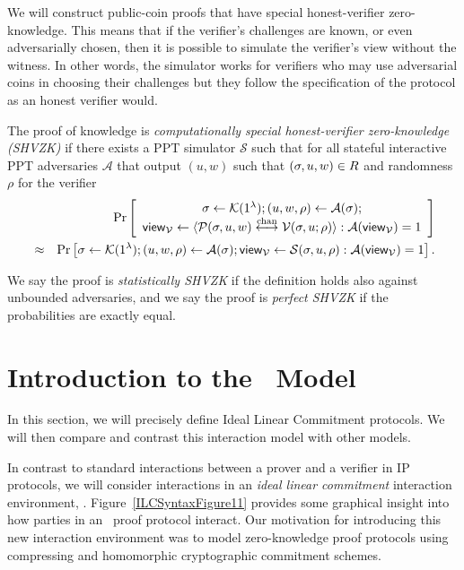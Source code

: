 We will construct public-coin proofs that have special honest-verifier zero-knowledge. This means that if the verifier's challenges are known, or even adversarially chosen, then it is possible to simulate the verifier's view without the witness.  In other words, the simulator works for verifiers who may use adversarial coins in choosing their challenges but they follow the specification of the protocol as an honest verifier would. 
\begin{definition}
The proof of knowledge is \emph{computationally special honest-verifier zero-knowledge (SHVZK)} if there exists a PPT simulator $\mathcal{S}$ such that for all stateful interactive PPT adversaries $\mathcal{A}$ that output $(u,w)$ such that $(\mathsf{\sigma},u,w)\in R$ and randomness $\rho$ for the verifier
\begin{eqnarray*}
&&\Pr \left[ \begin{array}{c}\mathsf{\sigma}\gets \mathcal{K}(1^{\lambda});(u, w, \rho) \leftarrow\mathcal{A}(\mathsf{\sigma}); \\
\mathsf{view}_{\mathcal{V}}\leftarrow \langle \mathcal{P}(\mathsf{\sigma},u,w)\overset{\textnormal{chan}}{\longleftrightarrow} \mathcal{V}(\mathsf{\sigma},u;\rho)\rangle: \mathcal{A}(\mathsf{view}_{\mathcal{V}})=1\end{array} \right]\\
&\approx &\Pr \left[ \mathsf{\sigma}\gets \mathcal{K}(1^{\lambda});(u, w, \rho) \leftarrow\mathcal{A}(\mathsf{\sigma}); \mathsf{view}_{\mathcal{V}}\leftarrow \mathcal{S}(\mathsf{\sigma},u,\rho): \mathcal{A}(\mathsf{view}_{\mathcal{V}})=1\right].
\end{eqnarray*}

We say the proof is \emph{statistically SHVZK} if the definition holds also against unbounded adversaries, and we say the proof is \emph{perfect SHVZK} if the probabilities are exactly equal.
\end{definition}

\section{Introduction to the \ILC\ Model}
\label{formalILCmodel}

In this section, we will precisely define Ideal Linear Commitment protocols. We will then compare and contrast this interaction model with other models.

In contrast to standard interactions between a prover and a verifier in IP protocols, we will consider interactions in an \emph{ideal linear commitment} interaction environment, \ILC. Figure~\ref{ILCSyntaxFigure11} provides some graphical insight into how parties in an \ILC\ proof protocol interact. Our motivation for introducing this new interaction environment was to model zero-knowledge proof protocols using compressing and homomorphic cryptographic commitment schemes.

